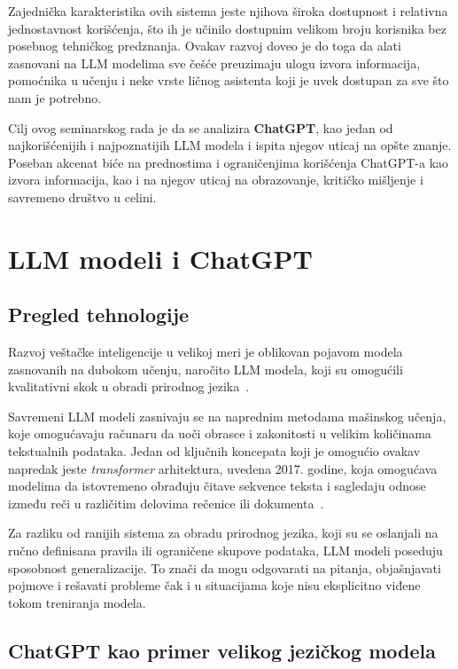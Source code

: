 \documentclass[a4paper, 12pt]{article}
\begin{document}
Zajednička karakteristika ovih sistema jeste njihova široka dostupnost i relativna jednostavnost korišćenja, što ih je učinilo dostupnim velikom broju korisnika bez posebnog tehničkog predznanja. Ovakav razvoj doveo je do toga da alati zasnovani na LLM modelima sve češće preuzimaju ulogu izvora informacija, pomoćnika u učenju i neke vrste ličnog asistenta koji je uvek dostupan za sve što nam je potrebno.

Cilj ovog seminarskog rada je da se analizira \textbf{ChatGPT}, kao jedan od najkorišćenijih i najpoznatijih LLM modela i ispita njegov uticaj na opšte znanje. Poseban akcenat biće na prednostima i ograničenjima korišćenja ChatGPT-a kao izvora informacija, kao i na njegov
uticaj na obrazovanje, kritičko mišljenje i savremeno društvo u celini.




\section{LLM modeli i ChatGPT}
\subsection{Pregled tehnologije}

Razvoj veštačke inteligencije u velikoj meri je oblikovan pojavom modela zasnovanih na dubokom učenju, naročito LLM modela, koji su omogućili kvalitativni skok u obradi prirodnog jezika~\cite{vaswani2017,bommasani2021}.

Savremeni LLM modeli zasnivaju se na naprednim metodama mašinskog učenja, koje omogućavaju računaru da uoči obrasce i zakonitosti u velikim količinama tekstualnih podataka. Jedan od ključnih koncepata koji je omogućio ovakav napredak jeste \textit{transformer} arhitektura, uvedena 2017. godine, koja omogućava modelima da istovremeno obrađuju čitave sekvence teksta i sagledaju odnose između reči u različitim delovima rečenice ili dokumenta~\cite{vaswani2017}.


Za razliku od ranijih sistema za obradu prirodnog jezika, koji su se oslanjali na ručno definisana pravila ili ograničene skupove podataka, LLM modeli poseduju sposobnost generalizacije. To znači da mogu odgovarati na pitanja, objašnjavati pojmove i rešavati probleme čak i u situacijama koje nisu eksplicitno viđene tokom treniranja modela.


\subsection{ChatGPT kao primer velikog jezičkog modela}
\end{document}
